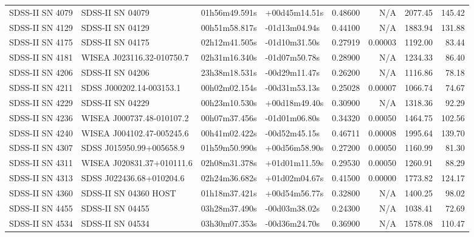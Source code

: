\begin{longtable}{llllrrrr}
SDSS-II SN 4079  &                SDSS-II SN 04079 &   01h56m49.591s &   +00d45m14.51s &  0.48600 &      N/A &  2077.45 &      145.42 \\
SDSS-II SN 4129  &                SDSS-II SN 04129 &   00h51m58.817s &   -01d13m04.94s &  0.44100 &      N/A &  1883.94 &      131.88 \\
SDSS-II SN 4175  &                SDSS-II SN 04175 &   02h12m41.505s &   -01d10m31.50s &  0.27919 &  0.00003 &  1192.00 &       83.44 \\
SDSS-II SN 4181  &       WISEA J023116.32-010750.7 &   02h31m16.340s &   -01d07m50.78s &  0.28900 &      N/A &  1234.33 &       86.40 \\
SDSS-II SN 4206  &                SDSS-II SN 04206 &   23h38m18.531s &   -00d29m11.47s &  0.26200 &      N/A &  1116.86 &       78.18 \\
SDSS-II SN 4211  &        SDSS J000202.14-003153.1 &   00h02m02.154s &   -00d31m53.13s &  0.25028 &  0.00007 &  1066.74 &       74.67 \\
SDSS-II SN 4229  &                SDSS-II SN 04229 &   00h23m10.530s &   +00d18m49.40s &  0.30900 &      N/A &  1318.36 &       92.29 \\
SDSS-II SN 4236  &       WISEA J000737.48-010107.2 &   00h07m37.456s &   -01d01m06.80s &  0.34320 &  0.00050 &  1464.75 &      102.56 \\
SDSS-II SN 4240  &       WISEA J004102.47-005245.6 &   00h41m02.422s &   -00d52m45.15s &  0.46711 &  0.00008 &  1995.64 &      139.70 \\
SDSS-II SN 4307  &        SDSS J015950.99+005658.9 &   01h59m50.990s &   +00d56m58.90s &  0.27200 &  0.00050 &  1160.99 &       81.30 \\
SDSS-II SN 4311  &       WISEA J020831.37+010111.6 &   02h08m31.378s &   +01d01m11.59s &  0.29530 &  0.00050 &  1260.91 &       88.29 \\
SDSS-II SN 4313  &        SDSS J022436.68+010204.6 &   02h24m36.682s &   +01d02m04.67s &  0.41500 &  0.00000 &  1773.82 &      124.17 \\
SDSS-II SN 4360  &           SDSS-II SN 04360 HOST &   01h18m37.421s &   +00d54m56.77s &  0.32800 &      N/A &  1400.25 &       98.02 \\
SDSS-II SN 4455  &                SDSS-II SN 04455 &   03h28m37.490s &   -00d03m38.02s &  0.24300 &      N/A &  1038.41 &       72.69 \\
SDSS-II SN 4534  &                SDSS-II SN 04534 &   03h30m07.353s &   -00d36m24.70s &  0.36900 &      N/A &  1578.08 &      110.47 \\

\end{longtable}
